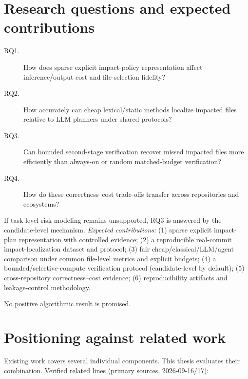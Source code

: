 \documentclass[11pt,a4paper]{article}
\begin{document}
\section{Research questions and expected contributions}
\label{sec:rq}

\begin{description}
  \item[RQ1.] How does sparse explicit impact-policy representation affect
  inference/output cost and file-selection fidelity?
  \item[RQ2.] How accurately can cheap lexical/static methods localize impacted
  files relative to LLM planners under shared protocols?
  \item[RQ3.] Can bounded second-stage verification recover missed impacted
  files more efficiently than always-on or random matched-budget verification?
  \item[RQ4.] How do these correctness--cost trade-offs transfer across
  repositories and ecosystems?
\end{description}

If task-level risk modeling remains unsupported, RQ3 is answered by the
candidate-level mechanism. \emph{Expected contributions:}
(1) sparse explicit impact-plan representation with controlled evidence;
(2) a reproducible real-commit impact-localization dataset and protocol;
(3) fair cheap/classical/LLM/agent comparison under common file-level metrics
and explicit budgets;
(4) a bounded/selective-compute verification protocol (candidate-level by
default);
(5) cross-repository correctness--cost evidence;
(6) reproducibility artifacts and leakage-control methodology.

No positive algorithmic result is promised.

\section{Positioning against related work}
\label{sec:related}

Existing work covers several individual components. This thesis evaluates their
combination. Verified related lines (primary sources, 2026-09-16/17):
\end{document}

